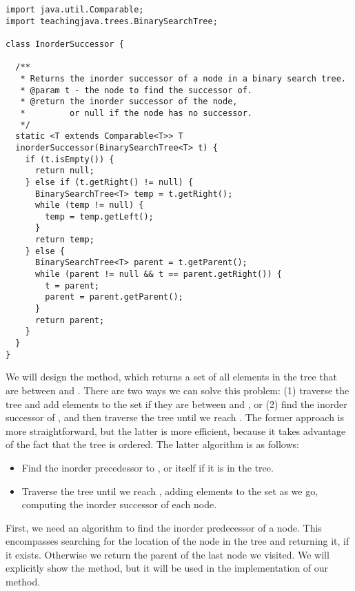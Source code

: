 \begin{lstlisting}[language=MyJava]
import java.util.Comparable;
import teachingjava.trees.BinarySearchTree;

class InorderSuccessor {

  /**
   * Returns the inorder successor of a node in a binary search tree.
   * @param t - the node to find the successor of.
   * @return the inorder successor of the node, 
   *         or null if the node has no successor.
   */
  static <T extends Comparable<T>> T 
  inorderSuccessor(BinarySearchTree<T> t) {
    if (t.isEmpty()) {
      return null;
    } else if (t.getRight() != null) {
      BinarySearchTree<T> temp = t.getRight();
      while (temp != null) {
        temp = temp.getLeft();
      }
      return temp;
    } else {
      BinarySearchTree<T> parent = t.getParent();
      while (parent != null && t == parent.getRight()) {
        t = parent;
        parent = parent.getParent();
      }
      return parent;
    }
  }
}
\end{lstlisting}

We will design the  method, which returns a set of all elements in the tree that are between  and . 
There are two ways we can solve this problem: (1) traverse the tree and add elements to the set if they are between  and , or (2) find the inorder successor of , and then traverse the tree until we reach .
The former approach is more straightforward, but the latter is more efficient, because it takes advantage of the fact that the tree is ordered. 
The latter algorithm is as follows:
\begin{itemize}
  \item Find the inorder precedessor to , or  itself if it is in the tree.
  \item Traverse the tree until we reach , adding elements to the set as we go, computing the inorder successor of each node.
\end{itemize}

First, we need an algorithm to find the inorder predecessor of a node. 
This encompasses searching for the location of the node in the tree and returning it, if it exists. Otherwise we return the parent of the last node we visited. We will explicitly show the  method, but it will be used in the implementation of our  method.

